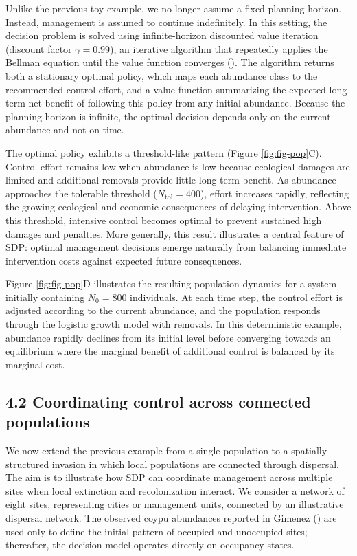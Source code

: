 \documentclass[
  11pt,
  a4paper,
]{article}
\begin{document}
Unlike the previous toy example, we no longer assume a fixed planning horizon. Instead, management is assumed to continue indefinitely. In this setting, the decision problem is solved using infinite-horizon discounted value iteration (discount factor \(\gamma=0.99\)), an iterative algorithm that repeatedly applies the Bellman equation until the value function converges (). The algorithm returns both a stationary optimal policy, which maps each abundance class to the recommended control effort, and a value function summarizing the expected long-term net benefit of following this policy from any initial abundance. Because the planning horizon is infinite, the optimal decision depends only on the current abundance and not on time.

The optimal policy exhibits a threshold-like pattern (Figure \ref{fig:fig-pop}C). Control effort remains low when abundance is low because ecological damages are limited and additional removals provide little long-term benefit. As abundance approaches the tolerable threshold (\(N_{\mathrm{tol}} = 400\)), effort increases rapidly, reflecting the growing ecological and economic consequences of delaying intervention. Above this threshold, intensive control becomes optimal to prevent sustained high damages and penalties. More generally, this result illustrates a central feature of SDP: optimal management decisions emerge naturally from balancing immediate intervention costs against expected future consequences.

Figure \ref{fig:fig-pop}D illustrates the resulting population dynamics for a system initially containing \(N_0 = 800\) individuals. At each time step, the control effort is adjusted according to the current abundance, and the population responds through the logistic growth model with removals. In this deterministic example, abundance rapidly declines from its initial level before converging towards an equilibrium where the marginal benefit of additional control is balanced by its marginal cost.

\subsection{4.2 Coordinating control across connected populations}\label{coordinating-control-across-connected-populations}

We now extend the previous example from a single population to a spatially structured invasion in which local populations are connected through dispersal. The aim is to illustrate how SDP can coordinate management across multiple sites when local extinction and recolonization interact. We consider a network of eight sites, representing cities or management units, connected by an illustrative dispersal network. The observed coypu abundances reported in Gimenez () are used only to define the initial pattern of occupied and unoccupied sites; thereafter, the decision model operates directly on occupancy states.
\end{document}
